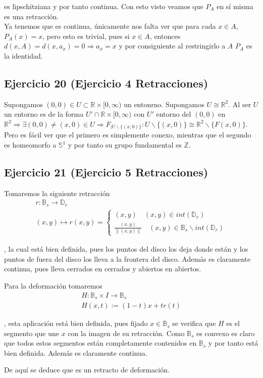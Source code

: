 \documentclass{article}
\begin{document}
es lipschitziana y por tanto continua. Con esto visto veamos que $P_A$ en sí misma es una retracción.\\

Ya tenemos que es continua, únicamente nos falta ver que para cada $x\in A$, $P_A(x)=x$, pero esto es trivial, pues si $x\in A$, entonces $d(x,A)=d(x,a_x)=0\Rightarrow a_x=x$ y por consiguiente al restringirlo a $A$ $P_A$ es la identidad.

\subsection{Ejercicio 20 (Ejercicio 4 Retracciones)}
Supongamos $(0,0)\in U\subset\mathbb{R}\times [0,\infty)$ un entonrno. Supongamos $U\cong \mathbb{R}^2$. Al ser $U$ un entorno es de la forma $U'\cap \mathbb{R}\times [0,\infty)$ con $U'$ entorno del $(0,0)$ en $\mathbb{R}^2 \Rightarrow \exists (0,0)\neq (x,0)\in U\Rightarrow F_{|U\backslash\{(x,0)\}}:U\backslash\{(x,0)\}\cong \mathbb{R}^2\backslash\{F(x,0)\}$. Pero es fácil ver que el primero es simplemente conexo, mientras que el segundo es homeomorfo a $\mathbb{S}^1$ y por tanto su grupo fundamental es $\mathbb{Z}$.

\subsection{Ejercicio 21 (Ejercicio 5 Retracciones)}
Tomaremos la siguiente retracción
\begin{gather*}
r:\mathbb{B}_s\rightarrow \mathbb{D}_r\\
(x,y)\mapsto r(x,y)=\left\lbrace\begin{array}{c}
(x,y)\quad (x,y)\in int(\mathbb{D}_r)\\
\frac{(x,y)}{\|(x,y)\|} \quad (x,y)\in \mathbb{B}_s\backslash int(\mathbb{D}_r)
\end{array}\right.
\end{gather*}

, la cual está bien definida, pues los puntos del disco los deja donde están y los puntos de fuera del disco los lleva a la frontera del disco. Además es claramente continua, pues lleva cerrados en cerrados y abiertos en abiertos.

Para la deformación tomaremos
\begin{gather*}
H:\mathbb{B}_s\times I\rightarrow \mathbb{B}_s\\
H(x,t):=(1-t)x+tr(t)
\end{gather*}

, esta aplicación está bien definida, pues fijado $x\in \mathbb{B}_s$ se verifica que $H$ es el segmento que une $x$ con la imagen de su retracción. Como $\mathbb{B}_s$ es convexo es claro que todos estos segmentos están completamente contenidos en $\mathbb{B}_s$ y por tanto está bien definida. Además es claramente continua. 

De aquí se deduce que es un retracto de deformación.
\end{document}
